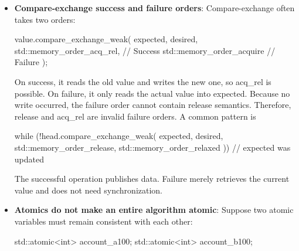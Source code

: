 \documentclass{report}
\begin{document}
\begin{itemize}
\begin{cppcode}
                // r1 == r2 == 0 possible
            \end{cppcode}
            \bigbreak \noindent 
            For thread 1s load
            \bigbreak \noindent 
            \begin{cppcode}
                r1 = y.load(std::memory_order::acquire);
            \end{cppcode}
            \begin{itemize}
                \item If it reads 1, it read from Thread 2’s release store, so synchronization occurs.
                \item If it reads the original 0, it did not read from Thread 2’s release store, so no synchronization occurs.
            \end{itemize}
            The same applies to Thread 2’s load of x. Therefore, if both loads read the initial values, neither acquire load read from the other thread’s release store
            \bigbreak \noindent 
            \textbf{Note:} The standard explicitly restricts stores to relaxed, release, or sequentially consistent ordering, and loads to relaxed, acquire, or sequentially consistent ordering
        \item \textbf{Compare-exchange success and failure orders}: Compare-exchange often takes two orders:
            \bigbreak \noindent 
            \begin{cppcode}
                value.compare_exchange_weak(
                    expected,
                    desired,
                    std::memory_order_acq_rel,  // Success
                    std::memory_order_acquire   // Failure
                );
            \end{cppcode}
            \bigbreak \noindent 
            On success, it reads the old value and writes the new one, so acq\_rel is possible.
            \bigbreak \noindent 
            On failure, it only reads the actual value into expected. Because no write occurred, the failure order cannot contain release semantics. Therefore, release and acq\_rel are invalid failure orders.
            \bigbreak \noindent 
            A common pattern is 
            \bigbreak \noindent 
            \begin{cppcode}
                while (!head.compare_exchange_weak(
                    expected,
                    desired,
                    std::memory_order_release,
                    std::memory_order_relaxed
                )) {
                    // expected was updated
                }
            \end{cppcode}
            \bigbreak \noindent 
            The successful operation publishes data. Failure merely retrieves the current value and does not need synchronization.
        \item \textbf{Atomics do not make an entire algorithm atomic}: Suppose two atomic variables must remain consistent with each other:
            \bigbreak \noindent 
            \begin{cppcode}
                std::atomic<int> account_a{100};
                std::atomic<int> account_b{100};


\end{cppcode}
\end{itemize}
\end{document}
